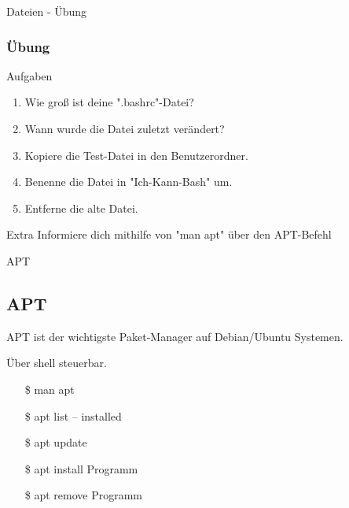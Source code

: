 \begin{frame}{Dateien - Übung}
    \subsubsection{Übung}\label{subsubsec:übung}

    \begin{alertblock}{Aufgaben}
        \begin{enumerate}
            \item Wie groß ist deine ".bashrc"-Datei?\pause
            \item Wann wurde die Datei zuletzt verändert?\pause
            \item Kopiere die Test-Datei in den Benutzerordner.\pause
            \item Benenne die Datei in "Ich-Kann-Bash" um.\pause
            \item Entferne die alte Datei.
        \end{enumerate}
    \end{alertblock}
    \pause

    \vspace{0.5cm}
    \begin{alertblock}{Extra}
        Informiere dich mithilfe von "man apt" über den APT-Befehl
    \end{alertblock}

\end{frame}

\begin{frame}{APT}
    \subsection{APT}\label{subsec:apt}

    APT ist der wichtigste Paket-Manager auf Debian/Ubuntu Systemen.
    \pause

    \textrightarrow Über shell steuerbar.
    \pause

    \begin{itemize}
        \item[\$] man apt\pause
        \item[\$] apt list  -- installed\pause
        \item[\$] apt update\pause
        \item[\$] apt install Programm\pause
        \item[\$] apt remove Programm
    \end{itemize}

\end{frame}

